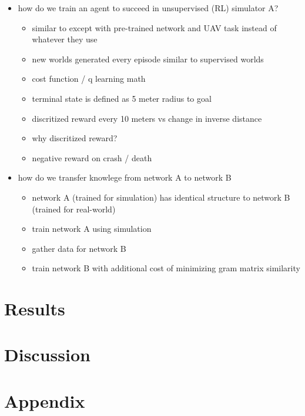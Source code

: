 \documentclass[paper=a4, fontsize=11pt]{scrartcl} %
\begin{document}
\begin{itemize}
	\item how do we train an agent to succeed in unsupervised (RL) simulator A?
	\begin{itemize}
		\item similar to \cite{Lillicrap2015} except with pre-trained network and UAV task instead of whatever they use
		\item new worlds generated every episode similar to supervised worlds
		\item cost function / q learning math
		\item terminal state is defined as 5 meter radius to goal
		\item discritized reward every 10 meters vs change in inverse distance
		\item why discritized reward?
		\item negative reward on crash / death
	\end{itemize}

	\item how do we transfer knowlege from network A to network B
	\begin{itemize}
		\item network A (trained for simulation) has identical structure to network B (trained for real-world)
		\item train network A using simulation
		\item gather data for network B
		\item train network B with additional cost of minimizing gram matrix similarity
	\end{itemize}

\end{itemize}


\section{Results}

\section{Discussion}


\section{Appendix}




\end{document}
